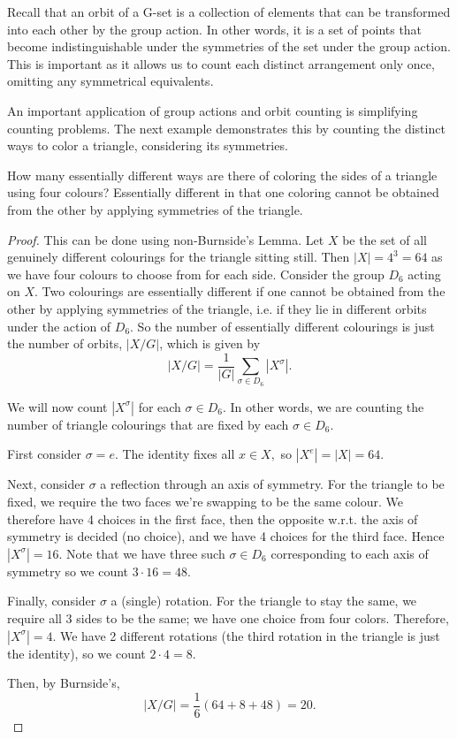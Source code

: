Recall that an orbit of a G-set is a collection of elements that can be transformed into each other by the group action. In other words, it is a set of points that become
indistinguishable under the symmetries of the set under the group action. This is important as it allows us to count each distinct arrangement only once, omitting any symmetrical equivalents. 
\begin{remark}
    An important application of group actions and orbit counting is simplifying counting problems. The next example demonstrates this by counting the distinct ways to color a triangle, considering its symmetries.
\end{remark}
\begin{example}
  How many essentially different ways are there of coloring the sides of a triangle using
  four colours?  Essentially different in that one coloring cannot be obtained from the
  other by applying symmetries of the triangle.
\end{example}
\begin{proof}
  This can be done using non-Burnside's Lemma. Let $X$ be the set of all genuinely different colourings for the triangle sitting still. Then $|X|=4^3=64$ as we have four colours to choose from for each side. 
  Consider the group $D_6$ acting on $X$. Two colourings are essentially different if one cannot be obtained from the
  other by applying symmetries of the triangle, i.e. if they lie in different orbits under
  the action of $D_6$. So the number of essentially different colourings is just the number of orbits, $|X/G|$, which is given by
  \[|X/G|=\frac{1}{|G|}\sum_{\sigma\in D_6}|X^{\sigma}|.\]

    We will now count $|X^{\sigma}|$ for each $\sigma \in D_6.$ In other words, we are counting the number of triangle colourings that are fixed by each $\sigma \in D_6.$ 
  
    First consider $\sigma=e.$ The identity fixes all $x\in X,$ so $|X^e|=|X|=64$.
    
    Next, consider $\sigma$ a reflection through an axis of symmetry. For the triangle to be fixed, we require the two faces we're swapping to be the same colour. We therefore have 4 choices in the first face, then the opposite w.r.t. the axis of symmetry is decided (no choice), and we have 4 choices for the third face. Hence $|X^{\sigma}|=16$. Note that we have three such $\sigma \in D_6$ corresponding to each axis of symmetry so we count $3\cdot 16=48$.

    Finally, consider $\sigma$ a (single) rotation. For the triangle to stay the same, we require all 3 sides to be the same; we have one choice from four colors. Therefore, $|X^{\sigma}|=4$. We have 2 different rotations (the third rotation in the triangle is just the identity), so we count $2\cdot 4= 8$.
  
  Then, by Burnside's,
  \[|X/G|=\frac{1}{6}(64+8+48) = 20.\]
\end{proof}
